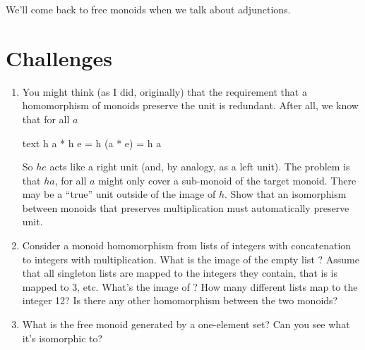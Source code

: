 We'll come back to free monoids when we talk about adjunctions.

\section{Challenges}

\begin{enumerate}
  \tightlist
  \item
        You might think (as I did, originally) that the requirement that a
        homomorphism of monoids preserve the unit is redundant. After all, we
        know that for all $a$

        \begin{snip}{text}
h a * h e = h (a * e) = h a
\end{snip}
        So $h e$ acts like a right unit (and, by analogy, as a left
        unit). The problem is that $h a$, for all $a$ might
        only cover a sub-monoid of the target monoid. There may be a ``true''
        unit outside of the image of $h$. Show that an isomorphism
        between monoids that preserves multiplication must automatically
        preserve unit.
  \item
        Consider a monoid homomorphism from lists of integers with
        concatenation to integers with multiplication. What is the image of
        the empty list \code{{[}{]}}? Assume that all singleton lists are
        mapped to the integers they contain, that is \code{{[}3{]}} is
        mapped to 3, etc. What's the image of \code{{[}1, 2, 3, 4{]}}?
        How many different lists map to the integer 12? Is there any other
        homomorphism between the two monoids?
  \item
        What is the free monoid generated by a one-element set? Can you see
        what it's isomorphic to?
\end{enumerate}
